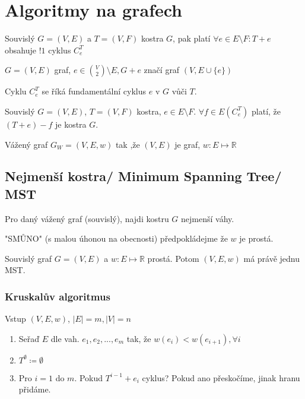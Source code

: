 \documentclass[../main.tex]{subfiles}
\begin{document}
\section{Algoritmy na grafech}

\begin{remark}
    Souvislý $G=(V,E)$ a $T=(V,F)$ kostra $G$, pak platí
    $\forall e \in E\setminus F: T + e$ obsahuje $!1$ cyklus $C_e^T$
\end{remark}

\begin{definition}
    $G=(V,E)$ graf, $e\in\binom{V}{2}\setminus E, G+e$ značí graf
    $(V, E\cup \{ e\})$
\end{definition}

\begin{definition}
    Cyklu $C_e^T$ se říká fundamentální cyklus $e$ v $G$
    vůči $T$.
\end{definition}

\begin{remark}
    Souvislý $G=(V,E)$, $T=(V,F)$ kostra, $e\in E\setminus F$.
    $\forall f \in E(C_e^T)$ platí, že $(T+e)-f$ je kostra $G$.
\end{remark}


\begin{definition}
    Vážený graf $G_W = (V,E,w)$ tak ,že  $(V,E)$ je graf, $w: E\mapsto \mathbb{R}$
\end{definition}

\subsection{Nejmenší kostra/ Minimum Spanning Tree/ MST}
Pro daný vážený graf (souvislý), najdi kostru $G$ nejmenší váhy.

"SMŮNO" (s malou úhonou na obecnosti) předpokládejme že $w$ je prostá.

\begin{claim}
    Souvislý graf $G= (V,E)$ a $w: E\mapsto \mathbb{R}$ prostá.
    Potom $(V,E,w)$ má právě jednu MST. 
\end{claim}

\subsubsection{Kruskalův algoritmus}
Vstup $(V,E,w)$, $|E|=m, |V|=n$
\begin{enumerate}
    \item Seřaď $E$ dle vah. $e_1, e_2,...,e_m$ tak, že $w(e_i) < w(e_{i+1}), \forall i$
    \item $T^\emptyset \coloneq \emptyset$
    \item Pro $i=1$ do $m$. Pokud $T^{i-1} + e_i$ cyklus? Pokud ano přeskočíme,  jinak hranu přidáme.
\end{enumerate}
\end{document}

